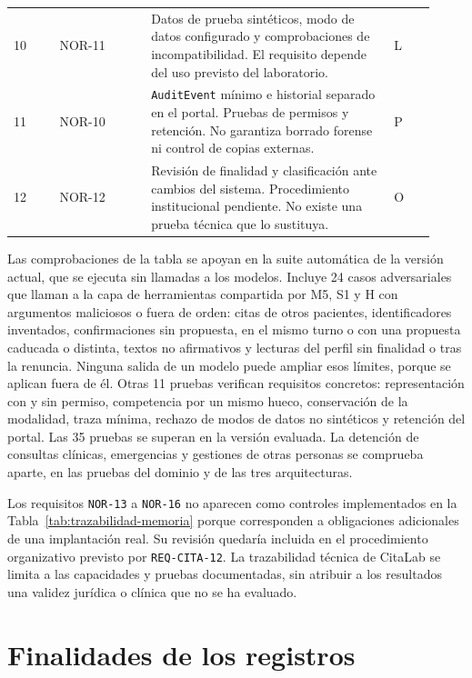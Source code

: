 \begin{landscape}
\begin{longtable}{L{0.10\linewidth}L{0.20\linewidth}L{0.53\linewidth}L{0.09\linewidth}}
10 & NOR-11 & Datos de prueba sintéticos, modo de datos configurado y comprobaciones de incompatibilidad. El requisito depende del uso previsto del laboratorio. & L \\
11 & NOR-10 & \texttt{AuditEvent} mínimo e historial separado en el portal. Pruebas de permisos y retención. No garantiza borrado forense ni control de copias externas. & P \\
12 & NOR-12 & Revisión de finalidad y clasificación ante cambios del sistema. Procedimiento institucional pendiente. No existe una prueba técnica que lo sustituya. & O \\
\bottomrule
\end{longtable}
\normalsize
\setlength{\tabcolsep}{6pt}
\end{landscape}

Las comprobaciones de la tabla se apoyan en la suite automática de la versión actual, que se ejecuta sin llamadas a los modelos. Incluye 24 casos adversariales que llaman a la capa de herramientas compartida por M5, S1 y H con argumentos maliciosos o fuera de orden: citas de otros pacientes, identificadores inventados, confirmaciones sin propuesta, en el mismo turno o con una propuesta caducada o distinta, textos no afirmativos y lecturas del perfil sin finalidad o tras la renuncia. Ninguna salida de un modelo puede ampliar esos límites, porque se aplican fuera de él. Otras 11 pruebas verifican requisitos concretos: representación con y sin permiso, competencia por un mismo hueco, conservación de la modalidad, traza mínima, rechazo de modos de datos no sintéticos y retención del portal. Las 35 pruebas se superan en la versión evaluada. La detención de consultas clínicas, emergencias y gestiones de otras personas se comprueba aparte, en las pruebas del dominio y de las tres arquitecturas.

Los requisitos \texttt{NOR-13} a \texttt{NOR-16} no aparecen como controles implementados en la Tabla~\ref{tab:trazabilidad-memoria} porque corresponden a obligaciones adicionales de una implantación real. Su revisión quedaría incluida en el procedimiento organizativo previsto por \texttt{REQ-CITA-12}. La trazabilidad técnica de CitaLab se limita a las capacidades y pruebas documentadas, sin atribuir a los resultados una validez jurídica o clínica que no se ha evaluado.

\section{Finalidades de los registros}

